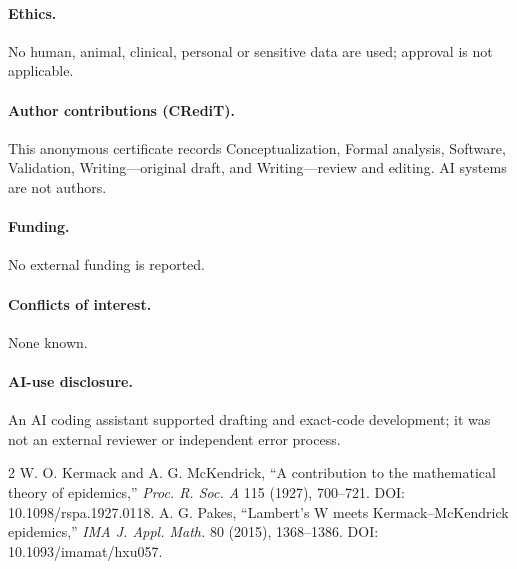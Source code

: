 \documentclass[9pt]{extarticle}
\begin{document}
\paragraph{Ethics.} No human, animal, clinical, personal or sensitive data are
used; approval is not applicable.
\paragraph{Author contributions (CRediT).} This anonymous certificate records
Conceptualization, Formal analysis, Software, Validation, Writing---original
draft, and Writing---review and editing. AI systems are not authors.
\paragraph{Funding.} No external funding is reported.
\paragraph{Conflicts of interest.} None known.
\paragraph{AI-use disclosure.} An AI coding assistant supported drafting and
exact-code development; it was not an external reviewer or independent error
process.

\begin{thebibliography}{2}
 W. O. Kermack and A. G. McKendrick, ``A contribution to the
mathematical theory of epidemics,'' \emph{Proc. R. Soc. A} 115 (1927),
700--721. DOI: 10.1098/rspa.1927.0118.
 A. G. Pakes, ``Lambert's W meets Kermack--McKendrick
epidemics,'' \emph{IMA J. Appl. Math.} 80 (2015), 1368--1386.
DOI: 10.1093/imamat/hxu057.
\end{thebibliography}
\end{document}

